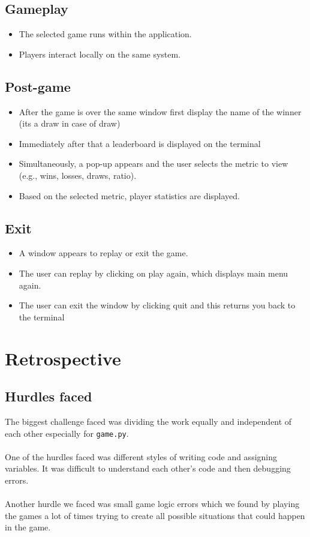 \documentclass[12pt]{article}
\begin{document}
\subsection{Gameplay}
\begin{itemize}
    \item The selected game runs within the application.
    \item Players interact locally on the same system.
\end{itemize}
\subsection{Post-game}
\begin{itemize}
    \item After the game is over the same window first display the name of the winner (its a draw in case of draw)
    \item Immediately after that a leaderboard is displayed on the terminal
    \item Simultaneously, a pop-up appears and the user selects the metric to view (e.g., wins, losses, draws, ratio).
    \item Based on the selected metric, player statistics are displayed.
\end{itemize}
\subsection{Exit}
\begin{itemize}
    \item A window appears to replay or exit the game.
    \item The user can replay by clicking on play again, which displays main menu again.
    \item The user can exit the window by clicking quit and this returns you back to the terminal
\end{itemize}
\section{Retrospective}
\subsection{Hurdles faced}
The biggest challenge faced was dividing the work equally and independent of each other especially for \texttt{game.py}.\\\\
One of the hurdles faced was different styles of writing code and assigning variables. It was difficult to understand each other’s code and then debugging errors.\\\\
Another hurdle we faced was small game logic errors which we found by playing the games a lot of times trying to create all possible situations that could happen in the game.
\end{document}
